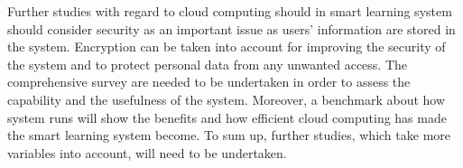 \documentclass[journal]{vgtc}
\begin{document}
Further studies with regard to cloud computing should in smart learning system should consider security as an important issue as users' information are stored in the system. Encryption can be taken into account for improving the security of the system and to protect personal data from any unwanted access. The comprehensive survey are needed to be undertaken in order to assess the capability and the usefulness of the system. Moreover, a benchmark about how system runs will show the benefits and how efficient cloud computing has made the smart learning system become. To sum up, further studies, which take more variables into account, will need to be undertaken.




\end{document}
